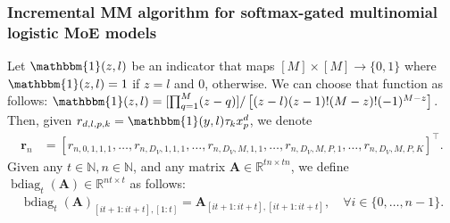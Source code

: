 \documentclass{article}
\newcommand{\mdm}{softmax-gated multinomial logistic MoE }
\DeclareMathOperator{\bdiag}{bdiag}
\newcommand{\I}{\mathbbm{1}}
\def\vr{{\bm{r}}}
\def\evx{{x}}
\def\mA{{\bm{A}}}
\def\sN{{\mathbb{N}}}
\def\sR{{\mathbb{R}}}
\begin{document}
\subsubsection{Incremental MM algorithm for \mdm models}\label{section_onlineMM_SGMLMoE}
Let $ \I(z,l)$ be an indicator that maps $[M]\times [M]\rightarrow \{0,1\}$ where $\I(z,l)=1$ if $z=l$ and 0, otherwise. We can choose that function as follows: $ \I(z,l)=[\prod_{q=1}^{M}(z-q)]/\left[(z-l)(z-1)!(M-z)!(-1)^{M-z}\right]$. Then, given $r_{d,l,p,k}=\I(y,l)\tau_{k}\evx_p^d$, we denote
\begin{align*}
    \vr_n&=[r_{n,0,1,1,1},\dots,r_{n,D_V,1,1,1},\dots,r_{n,D_V,M,1,1},\dots,r_{n,D_V,M,P,1},\dots,r_{n,D_V,M,P,K}]^{\top}.
\end{align*}
Given any $t \in \sN, n \in \sN$, and any matrix $\mA \in \sR^{tn\times tn}$, we define ${\bdiag}_t(\mA)\in \sR^{nt\times t}$ as follows:
\begin{align*}
    {\bdiag}_t(\mA)_{[it+1:it+t],[1:t]}=\mA_{[it+1:it+t],[it+1:it+t]},\quad \forall i \in \{0,\dots,n-1\}.
\end{align*}
\end{document}
